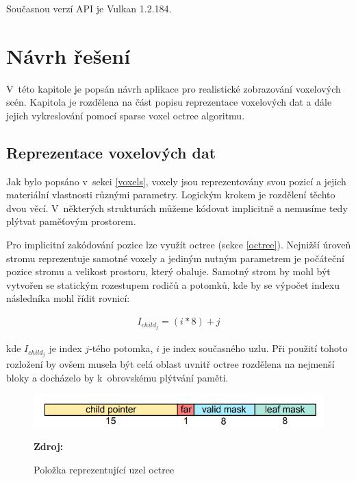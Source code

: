 Současnou verzí API je Vulkan 1.2.184\cite{vulkanspec}.

\chapter{Návrh řešení}
\label{navrh}
V~této kapitole je popsán návrh aplikace pro realistické zobrazování voxelových scén. Kapitola je rozdělena na část popisu reprezentace voxelových dat a dále jejich vykreslování pomocí sparse voxel octree algoritmu.

\section{Reprezentace voxelových dat}\label{sec:voxel_representation}
Jak bylo popsáno v~sekci \ref{voxels}, voxely jsou reprezentovány svou pozicí a jejich materiální vlastnosti různými parametry. Logickým krokem je rozdělení těchto dvou věcí. V~některých strukturách můžeme kódovat implicitně a nemusíme tedy plýtvat paměťovým prostorem.

Pro implicitní zakódování pozice lze využít octree (sekce \ref{octree}). Nejnižší úroveň stromu reprezentuje samotné voxely a jediným nutným parametrem je počáteční pozice stromu a velikost prostoru, který obaluje. Samotný strom by mohl být vytvořen se statickým rozestupem rodičů a potomků, kde by se výpočet indexu následníka mohl řídit rovnicí:

\begin{equation} \label{eq:simple_octree_index}
	\begin{gathered}
		I_{child_j} = (i * 8) + j
	\end{gathered}
\end{equation}

kde $I_{child_j}$ je index $j$-tého potomka, $i$ je index současného uzlu. Při použití tohoto rozložení by ovšem musela být celá oblast uvnitř octree rozdělena na nejmenší bloky a docházelo by k~obrovskému plýtvání paměti.

\begin{figure}[H]
	\centering
	\includegraphics[scale=1.7]{obrazky-figures/octree_child_data.png}
	\caption{Položka reprezentující uzel octree}
	\textbf{Zdroj: \cite{Laine2011EfficientSV}}
	\label{fig:octree_child}
\end{figure}

